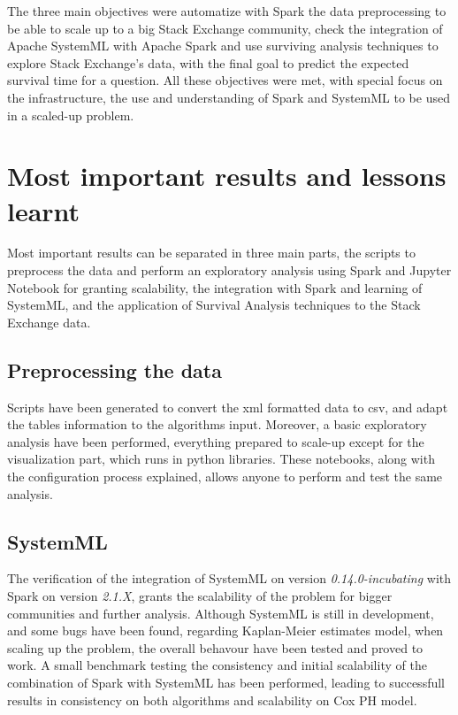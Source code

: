 \documentclass[11pt]{book} %
\begin{document}
    The three main objectives were automatize with Spark the data preprocessing to be able to scale up to a big Stack Exchange community, check the integration of Apache SystemML with Apache Spark and use surviving analysis techniques to explore Stack Exchange's data, with the final goal to predict the expected survival time for a question. All these objectives were met, with special focus on the infrastructure, the use and understanding of Spark and SystemML to be used in a scaled-up problem.

  \section{Most important results and lessons learnt}

    Most important results can be separated in three main parts, the scripts to preprocess the data and perform an exploratory analysis using Spark and Jupyter Notebook for granting scalability, the integration with Spark and learning of SystemML, and the application of Survival Analysis techniques to the Stack Exchange data.

    \subsection{Preprocessing the data}

      Scripts have been generated to convert the xml formatted data to csv, and adapt the tables information to the algorithms input. Moreover, a basic exploratory analysis have been performed, everything prepared to scale-up except for the visualization part, which runs in python libraries.
      These notebooks, along with the configuration process explained, allows anyone to perform and test the same analysis.

    \subsection{SystemML}

      The verification of the integration of SystemML on version \emph{0.14.0-incubating} with Spark on version \emph{2.1.X}, grants the scalability of the problem for bigger communities and further analysis.
      Although SystemML is still in development, and some bugs have been found, regarding Kaplan-Meier estimates model, when scaling up the problem, the overall behavour have been tested and proved to work.
      A small benchmark testing the consistency and initial scalability of the combination of Spark with SystemML has been performed, leading to successfull results in consistency on both algorithms and scalability on Cox PH model.
\end{document}
